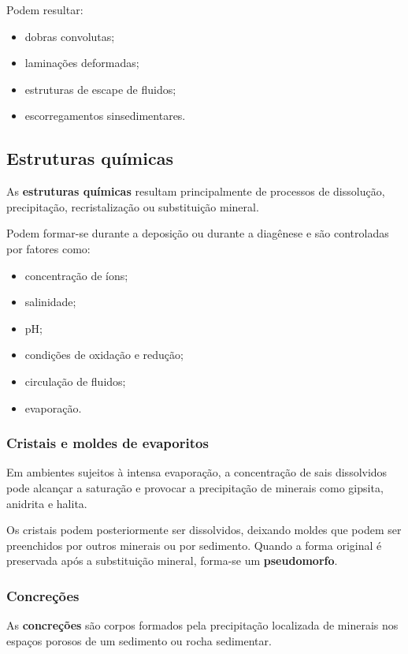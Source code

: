 Podem resultar:

\begin{itemize}
    \item dobras convolutas;
    \item laminações deformadas;
    \item estruturas de escape de fluidos;
    \item escorregamentos sinsedimentares.
\end{itemize}

\subsection{Estruturas químicas}

As \textbf{estruturas químicas} resultam principalmente de processos de
dissolução, precipitação, recristalização ou substituição mineral.

Podem formar-se durante a deposição ou durante a diagênese e são controladas por
fatores como:

\begin{itemize}
    \item concentração de íons;
    \item salinidade;
    \item pH;
    \item condições de oxidação e redução;
    \item circulação de fluidos;
    \item evaporação.
\end{itemize}

\subsubsection{Cristais e moldes de evaporitos}

Em ambientes sujeitos à intensa evaporação, a concentração de sais dissolvidos
pode alcançar a saturação e provocar a precipitação de minerais como gipsita,
anidrita e halita.

Os cristais podem posteriormente ser dissolvidos, deixando moldes que podem ser
preenchidos por outros minerais ou por sedimento. Quando a forma original é
preservada após a substituição mineral, forma-se um \textbf{pseudomorfo}.

\subsubsection{Concreções}

As \textbf{concreções} são corpos formados pela precipitação localizada de
minerais nos espaços porosos de um sedimento ou rocha sedimentar.

